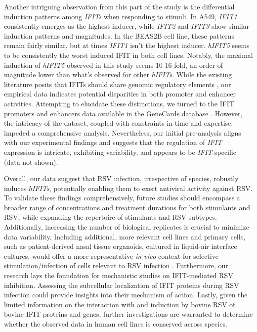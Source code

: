 Another intriguing observation from this part of the study is the differential induction patterns among \textit{IFITs} when responding to stimuli. In A549, \textit{IFIT1} consistently emerges as the highest inducer, while \textit{IFIT2} and \textit{IFIT3} show similar induction patterns and magnitudes. In the BEAS2B cell line, these patterns remain fairly similar, but at times \textit{IFIT1} isn't the highest inducer. \textit{hIFIT5} seems to be consistently the worst induced IFIT in both cell lines. Notably, the maximal induction of \textit{hIFIT5} observed in this study seems 10-16 fold, an order of magnitude lower than what's observed for other \textit{hIFITs}. While the existing literature posits that IFITs should share genomic regulatory elements \cite{Lou2009IFR-9/STAT2STAT1}, our empirical data indicates potential disparities in both promoter and enhancer activities. Attempting to elucidate these distinctions, we turned to the IFIT promoters and enhancers data available in the GeneCards database \cite{Stelzer2016TheAnalyses, Fishilevich2017GeneHancer:GeneCards}. However, the intricacy of the dataset, coupled with constraints in time and expertise, impeded a comprehensive analysis. Nevertheless, our initial pre-analysis aligns with our experimental findings and suggests that the regulation of \textit{IFIT} expression is intricate, exhibiting variability, and appears to be \textit{IFIT}-specific (data not shown).

Overall, our data suggest that RSV infection, irrespective of species, robustly induces \textit{hIFITs}, potentially enabling them to exert antiviral activity against RSV. To validate these findings comprehensively, future studies should encompass a broader range of concentrations and treatment durations for both stimulants and RSV, while expanding the repertoire of stimulants and RSV subtypes. Additionally, increasing the number of biological replicates is crucial to minimize data variability. Including additional, more relevant cell lines and primary cells, such as patient-derived nasal tissue organoids, cultured in liquid-air interface cultures, would offer a more representative \textit{in vivo} context for selective stimulation/infection of cells relevant to RSV infection \cite{Michi2021ACells, Rajan2022TheTherapeutics}. Furthermore, our research lays the foundation for mechanistic studies on IFIT-mediated RSV inhibition. Assessing the subcellular localization of IFIT proteins during RSV infection could provide insights into their mechanism of action. Lastly, given the limited information on the interaction with and induction by bovine RSV of bovine IFIT proteins and genes, further investigations are warranted to determine whether the observed data in human cell lines is conserved across species.

